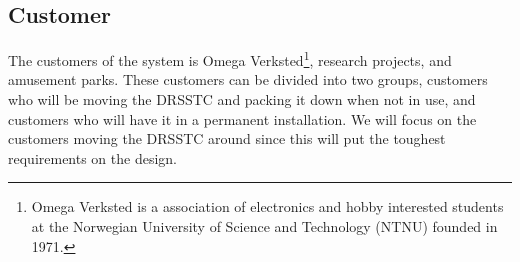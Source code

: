 \subsection{Customer}
The customers of the system is Omega Verksted\footnote{Omega Verksted is a association of electronics and hobby interested students at the Norwegian University of Science and Technology (NTNU) founded in 1971.}, research projects, and amusement parks. These customers can be divided into two groups, customers who will be moving the DRSSTC and packing it down when not in use, and customers who will have it in a permanent installation. We will focus on the customers moving the DRSSTC around since this will put the toughest requirements on the design.